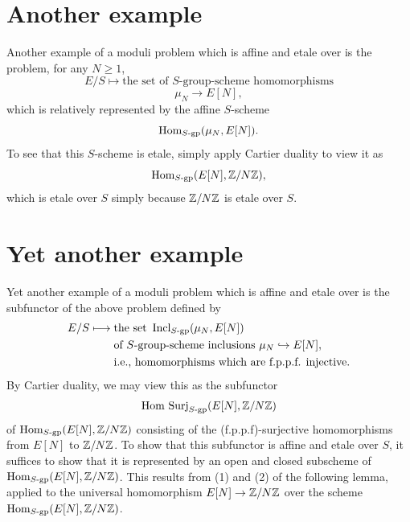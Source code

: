 \section{Another example}
\label{sec:4.8}

Another example of a moduli problem which is affine and etale over \Ell is the problem, for any $N \ge 1$,
\[
E/S \longmapsto \text{the set of } S\text{-group-scheme homomorphisms}
\]
\[
\mu_N \longrightarrow E[N],
\]
which is relatively represented by the affine $S$-scheme
\[
\operatorname{Hom}_{S\text{-gp}}(\mu_N, E[N]).
\]
To see that this $S$-scheme is etale, simply apply Cartier duality to view it as
\[
\operatorname{Hom}_{S\text{-gp}}(E[N], \mathbb{Z}/N\mathbb{Z}),
\]
which is etale over $S$ simply because $\mathbb{Z}/N\mathbb{Z}$ is etale over $S$.

\section{Yet another example}
\label{sec:4.9}

Yet another example of a moduli problem which is affine and etale over \Ell is the subfunctor of the above problem defined by
\[
\begin{aligned}
E/S \longmapsto {} & \text{the set } \operatorname{Incl}_{S\text{-gp}}(\mu_N, E[N]) \\
& \text{of } S\text{-group-scheme inclusions } \mu_N \hookrightarrow E[N], \\
& \text{i.e., homomorphisms which are f.p.p.f. injective.}
\end{aligned}
\]
By Cartier duality, we may view this as the subfunctor
\[
\operatorname{Hom}\,\mathrm{Surj}_{S\text{-gp}}(E[N], \mathbb{Z}/N\mathbb{Z})
\]
of $\operatorname{Hom}_{S\text{-gp}}(E[N], \mathbb{Z}/N\mathbb{Z})$ consisting of the (f.p.p.f)-surjective homomorphisms from $E[N]$ to $\mathbb{Z}/N\mathbb{Z}$. To show that this subfunctor is affine and etale over $S$, it suffices to show that it is represented by an open and closed subscheme of $\operatorname{Hom}_{S\text{-gp}}(E[N], \mathbb{Z}/N\mathbb{Z})$. This results from (1) and (2) of the following lemma, applied to the universal homomorphism $E[N] \to \mathbb{Z}/N\mathbb{Z}$ over the scheme $\operatorname{Hom}_{S\text{-gp}}(E[N], \mathbb{Z}/N\mathbb{Z})$.

